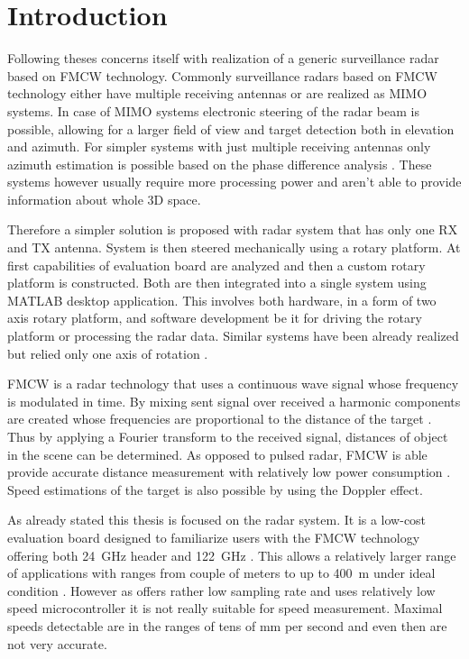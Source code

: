 
\chapter*{Introduction}

Following theses concerns itself with realization of a generic surveillance radar based on FMCW technology.
Commonly surveillance radars based on FMCW technology either have multiple receiving antennas or are realized as MIMO systems.
In case of MIMO systems electronic steering of the radar beam is possible, allowing for a larger field of view and target detection both in elevation and azimuth.
For simpler systems with just multiple receiving antennas only azimuth estimation is possible based on the phase difference analysis \cite{sandeep2018}.
These systems however usually require more processing power and aren't able to provide information about whole 3D space.

Therefore a simpler solution is proposed with radar system that has only one RX and TX antenna.
System is then steered mechanically using a rotary platform.
At first capabilities of \sidar evaluation board are analyzed and then a custom rotary platform is constructed.
Both are then integrated into a single system using MATLAB desktop application.
This involves both hardware, in a form of two axis rotary platform, and software development be it for driving the rotary platform or processing the radar data.
Similar systems have been already realized but relied only one axis of rotation \cite{nowok2017, vivet2013}.

FMCW is a radar technology that uses a continuous wave signal whose frequency is modulated in time.
By mixing sent signal over received a harmonic components are created whose frequencies are proportional to the distance of the target \cite{graham2005}.
Thus by applying a Fourier transform to the received signal, distances of object in the scene can be determined.
As opposed to pulsed radar, FMCW is able provide accurate distance measurement with relatively low power consumption \cite{jankiraman2018}.
Speed estimations of the target is also possible by using the Doppler effect.


As already stated this thesis is focused on the \sidar radar system.
It is a low-cost evaluation board designed to familiarize users with the FMCW technology offering both 24~GHz header and 122~GHz \cite{sidarMAN}.
This allows a relatively larger range of applications with ranges from couple of meters to up to 400~m under ideal condition \cite{sidarMANOld}.
However as \sidar offers rather low sampling rate and uses relatively low speed microcontroller it is not really suitable for speed measurement.
Maximal speeds detectable are in the ranges of tens of mm per second and even then are not very accurate.


